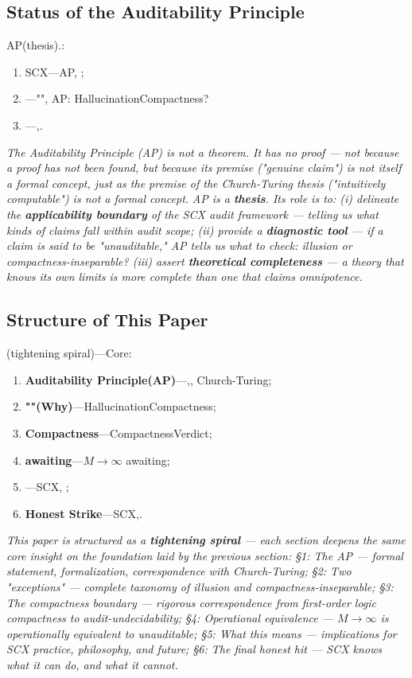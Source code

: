 \documentclass[12pt,a4paper]{article}
\theoremstyle{plain}
\theoremstyle{definition}
\theoremstyle{remark}
\begin{document}
\subsection{Status of the Auditability Principle}
AP(thesis).: 
\begin{enumerate}[label=(\roman*)]
 \item SCX---AP, ; 
 \item ---"", AP: HallucinationCompactness?
 \item ---,.
\end{enumerate}
\vspace{4pt}
\noindent
\textit{The Auditability Principle (AP) is not a theorem. It has no proof --- not because a proof has not been found, but because its premise ("genuine claim") is not itself a formal concept, just as the premise of the Church-Turing thesis ("intuitively computable") is not a formal concept.}
\textit{AP is a \textbf{thesis}. Its role is to: (i) delineate the \textbf{applicability boundary} of the SCX audit framework --- telling us what kinds of claims fall within audit scope; (ii) provide a \textbf{diagnostic tool} --- if a claim is said to be "unauditable," AP tells us what to check: illusion or compactness-inseparable? (iii) assert \textbf{theoretical completeness} --- a theory that knows its own limits is more complete than one that claims omnipotence.}
\subsection{}
\subsection{Structure of This Paper}
(tightening spiral)---Core: 
\begin{enumerate}[label=\S\arabic*:]
 \item \textbf{Auditability Principle(AP)}---,, Church-Turing; 
 \item \textbf{""(Why)}---HallucinationCompactness; 
 \item \textbf{Compactness}---CompactnessVerdict; 
 \item \textbf{awaiting}---$M\to\infty$ awaiting; 
 \item ---SCX, ; 
 \item \textbf{Honest Strike}---SCX,.
\end{enumerate}
\vspace{4pt}
\noindent
\textit{This paper is structured as a \textbf{tightening spiral} --- each section deepens the same core insight on the foundation laid by the previous section: \S1: The AP --- formal statement, formalization, correspondence with Church-Turing; \S2: Two "exceptions" --- complete taxonomy of illusion and compactness-inseparable; \S3: The compactness boundary --- rigorous correspondence from first-order logic compactness to audit-undecidability; \S4: Operational equivalence --- $M\to\infty$ is operationally equivalent to unauditable; \S5: What this means --- implications for SCX practice, philosophy, and future; \S6: The final honest hit --- SCX knows what it can do, and what it cannot.}
\newpage
\end{document}
